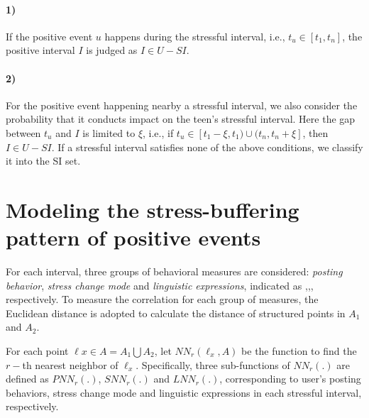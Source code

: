 \paragraph{1)} If the positive event $u$ happens during the stressful interval, i.e., $t_u \in [t_1,t_n]$, the positive interval $I$ is judged as $I \in U-SI$.
\paragraph{2)} For the positive event happening nearby a stressful interval,
we also consider the probability that it conducts impact on the teen's stressful interval.
Here the gap between $t_u$ and $I$ is limited to $\xi$, i.e.,
if $t_u \in [t_{1}-\xi, t_1)\cup(t_{n},t_{n}+\xi]$, then $I \in U-SI$.
If a stressful interval satisfies none of the above conditions, we classify it into the SI set.

\section{Modeling the stress-buffering pattern of positive events}
\label{mod:mod1}
For each interval, three groups of behavioral measures are considered: \emph{posting behavior},
\emph{stress change mode} and \emph{linguistic expressions},
indicated as ,,, respectively.
To measure the correlation for each group of measures,
the Euclidean distance is adopted to calculate the distance of structured points in $A_1$ and $A_2$.

For each point $\ell x \in A=A_1\bigcup A_2$,
let $NN_r(\ell_x,A)$ be the function to find the $r-$th nearest neighbor of $\ell_x$.
Specifically, three sub-functions of $NN_r(.)$ are defined as $PNN_r(.)$, $SNN_r(.)$ and $LNN_r(.)$,
corresponding to user's posting behaviors, stress change mode and linguistic expressions in each stressful interval, respectively.

